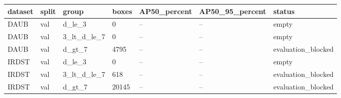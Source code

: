 \begin{tabular}{lllllll}
\hline
dataset & split & group & boxes & AP50\_percent & AP50\_95\_percent & status \\
\hline
DAUB & val & d\_le\_3 & 0 & -- & -- & empty \\
DAUB & val & 3\_lt\_d\_le\_7 & 0 & -- & -- & empty \\
DAUB & val & d\_gt\_7 & 4795 & -- & -- & evaluation\_blocked \\
IRDST & val & d\_le\_3 & 0 & -- & -- & empty \\
IRDST & val & 3\_lt\_d\_le\_7 & 618 & -- & -- & evaluation\_blocked \\
IRDST & val & d\_gt\_7 & 20145 & -- & -- & evaluation\_blocked \\
\hline
\end{tabular}
